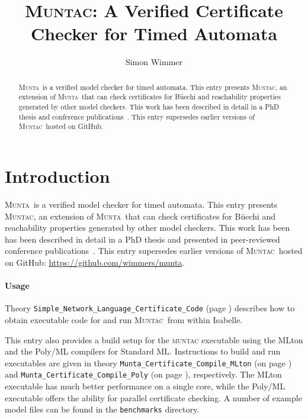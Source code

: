 \documentclass[10pt,a4paper]{article}
\newcommand{\munta}{\textsc{Munta}}
\newcommand{\muntac}{\textsc{Muntac}}
\begin{document}
\title{\muntac: A Verified Certificate Checker for Timed Automata}
\author{Simon Wimmer}
\date{}

\maketitle
\begin{abstract}
  \munta\ is a verified model checker for timed automata.
  This entry presents \muntac, an extension of \munta\ that can check certificates for
  B\"uechi and reachability properties generated by other model checkers.
  This work has been described in detail in a PhD thesis \cite{wimmer-phd}
  and conference publications~\cite{muntac-tacas,muntac-formats}.
  This entry supersedes earlier versions of \muntac\ hosted on GitHub.
\end{abstract}

\setcounter{tocdepth}{2}
\tableofcontents
\newpage

\section*{Introduction}

\munta\ is a verified model checker for timed automata.
This entry presents \muntac, an extension of \munta\ that can check certificates for
B\"uechi and reachability properties generated by other model checkers.
This work has been has been described in detail in a PhD thesis \cite{wimmer-phd}
and presented in peer-reviewed conference publications~\cite{muntac-tacas,muntac-formats}.
This entry supersedes earlier versions of \muntac\ hosted on GitHub:
\url{https://github.com/wimmers/munta}.

\paragraph{Usage}
Theory \texttt{Simple\_Network\_Language\_Certificate\_Code} (page \pageref{export-muntac}) describes
how to obtain executable code for and run \muntac\ from within Isabelle.

This entry also provides a build setup for the \textsc{muntac} executable
using the MLton and the Poly/ML compilers for Standard ML.
Instructions to build and run executables are given in theory \texttt{Munta\_Certificate\_Compile\_MLton}
(on page \pageref{build-mlton}) and \texttt{Munta\_Certificate\_Compile\_Poly}
(on page \pageref{build-poly}), respectively.
The MLton executable has much better performance on a single core, while the Poly/ML executable
offers the ability for parallel certificate checking.
A number of example model files can be found in the \texttt{benchmarks} directory.
\end{document}
